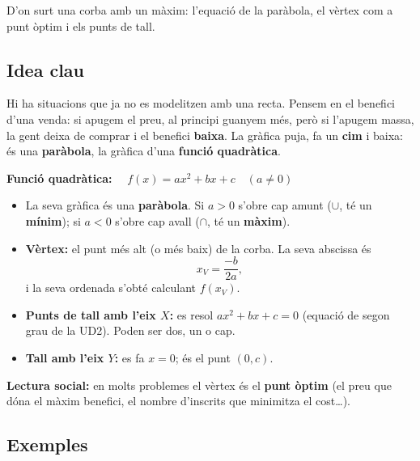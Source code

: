 %
{D'on surt una corba amb un màxim: l'equació de la paràbola, el vèrtex com a punt òptim i els punts de tall.}

\subsection{Idea clau}

Hi ha situacions que ja no es modelitzen amb una recta. Pensem en el benefici d'una
venda: si apugem el preu, al principi guanyem més, però si l'apugem massa, la gent
deixa de comprar i el benefici \textbf{baixa}. La gràfica puja, fa un \textbf{cim} i
baixa: és una \textbf{paràbola}, la gràfica d'una \textbf{funció quadràtica}.

\begin{idea}
\textbf{Funció quadràtica:} $\quad f(x)=ax^2+bx+c \quad (a\neq 0)$
\begin{itemize}[leftmargin=1.4em, itemsep=2pt]
  \item La seva gràfica és una \textbf{paràbola}. Si $a>0$ s'obre cap amunt
        ($\cup$, té un \textbf{mínim}); si $a<0$ s'obre cap avall
        ($\cap$, té un \textbf{màxim}).
  \item \textbf{Vèrtex:} el punt més alt (o més baix) de la corba. La seva abscissa és
        \[
        x_V=\frac{-b}{2a},
        \]
        i la seva ordenada s'obté calculant $f(x_V)$.
  \item \textbf{Punts de tall amb l'eix $X$:} es resol $ax^2+bx+c=0$ (equació de segon
        grau de la UD2). Poden ser dos, un o cap.
  \item \textbf{Tall amb l'eix $Y$:} es fa $x=0$; és el punt $(0,c)$.
\end{itemize}
\textbf{Lectura social:} en molts problemes el vèrtex és el \textbf{punt òptim} (el
preu que dóna el màxim benefici, el nombre d'inscrits que minimitza el cost…).
\end{idea}

\subsection{Exemples}

